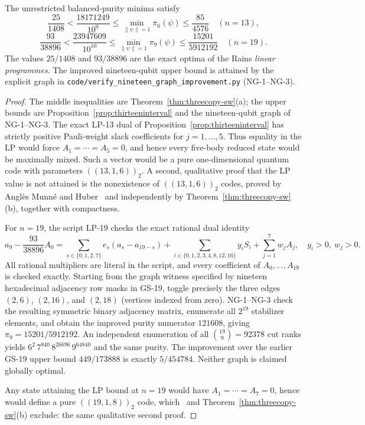 \begin{theorem}\label{thm:strictLP1319}
The unrestricted balanced-purity minima satisfy
\[
 \boxed{\frac{25}{1408}<\frac{18171249}{10^9}\le\min_{\|\psi\|=1}\pi_6(\psi)
      \le\frac{85}{4576}\quad(n=13),}
\]
\[
 \boxed{\frac{93}{38896}<\frac{23947609}{10^{10}}\le\min_{\|\psi\|=1}\pi_9(\psi)
      \le\frac{15201}{5912192}\quad(n=19).}
\]
The values $25/1408$ and $93/38896$ are the exact optima of the Rains
\emph{linear programmes}. The improved nineteen-qubit upper bound is attained by the explicit graph
in \texttt{code/verify\_nineteen\_graph\_improvement.py} (NG-1--NG-3).
\end{theorem}
\begin{proof}
The middle inequalities are Theorem~\ref{thm:threecopy-sw}(a); the upper
bounds are Proposition~\ref{prop:thirteeninterval} and the nineteen-qubit graph of NG-1--NG-3.
The exact LP-13 dual of Proposition~\ref{prop:thirteeninterval}
has strictly positive Pauli-weight slack coefficients for $j=1,\ldots,5$.
Thus equality in the LP would force $A_1=\cdots=A_5=0$, and hence every
five-body reduced state would be maximally mixed. Such a vector would
be a pure one-dimensional quantum code with parameters
$((13,1,6))_2$. A second, qualitative proof that the LP value is not
attained is the nonexistence of $((13,1,6))_2$ codes, proved by
Angl\`es Munn\'e and Huber~\cite{AMH26} and independently by
Theorem~\ref{thm:threecopy-sw}(b), together with compactness.

For $n=19$, the script LP-19 checks the exact rational dual identity
\[
 a_9-\frac{93}{38896}A_0
 =\sum_{s\in\{0,1,2,7\}}e_s(a_s-a_{19-s})
  +\sum_{i\in\{0,1,2,3,4,8,12,16\}}y_iS_i
  +\sum_{j=1}^{7}w_j A_j,
 \quad y_i>0,\ w_j>0.
\]
All rational multipliers are literal in the script, and every
coefficient of $A_0,\ldots,A_{19}$ is checked exactly.
Starting from the graph witness specified by nineteen hexadecimal adjacency
row masks in GS-19, toggle precisely the three edges $(2,6)$, $(2,16)$, and
$(2,18)$ (vertices indexed from zero). NG-1--NG-3 check the resulting
symmetric binary adjacency matrix, enumerate all $2^{19}$ stabilizer elements,
and obtain the improved purity numerator $121608$, giving
$\pi_9=15201/5912192$. An independent enumeration of all
$\binom{19}{9}=92378$ cut ranks yields
$6^2\,7^{840}\,8^{26696}\,9^{64840}$ and the same purity.
The improvement over the earlier GS-19 upper bound $449/173888$ is exactly
$5/454784$. Neither graph is claimed globally optimal.

Any state attaining the LP bound at $n=19$ would have
$A_1=\cdots=A_7=0$, hence would define a pure
$((19,1,8))_2$ code, which~\cite{AMH26} and
Theorem~\ref{thm:threecopy-sw}(b) exclude: the same qualitative
second proof.
\end{proof}
